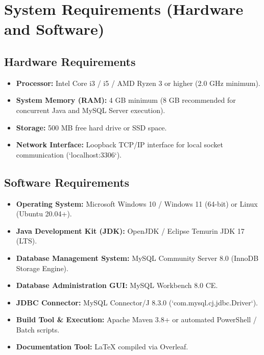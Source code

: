 \documentclass[12pt,a4paper]{article}
\begin{document}
\section{System Requirements (Hardware and Software)}
\label{sec:req}

\subsection{Hardware Requirements}
\begin{itemize}[noitemsep]
    \item \textbf{Processor:} Intel Core i3 / i5 / AMD Ryzen 3 or higher (2.0 GHz minimum).
    \item \textbf{System Memory (RAM):} 4 GB minimum (8 GB recommended for concurrent Java and MySQL Server execution).
    \item \textbf{Storage:} 500 MB free hard drive or SSD space.
    \item \textbf{Network Interface:} Loopback TCP/IP interface for local socket communication (`localhost:3306`).
\end{itemize}

\subsection{Software Requirements}
\begin{itemize}[noitemsep]
    \item \textbf{Operating System:} Microsoft Windows 10 / Windows 11 (64-bit) or Linux (Ubuntu 20.04+).
    \item \textbf{Java Development Kit (JDK):} OpenJDK / Eclipse Temurin JDK 17 (LTS).
    \item \textbf{Database Management System:} MySQL Community Server 8.0 (InnoDB Storage Engine).
    \item \textbf{Database Administration GUI:} MySQL Workbench 8.0 CE.
    \item \textbf{JDBC Connector:} MySQL Connector/J 8.3.0 (`com.mysql.cj.jdbc.Driver`).
    \item \textbf{Build Tool \& Execution:} Apache Maven 3.8+ or automated PowerShell / Batch scripts.
    \item \textbf{Documentation Tool:} LaTeX compiled via Overleaf.
\end{itemize}
\end{document}
